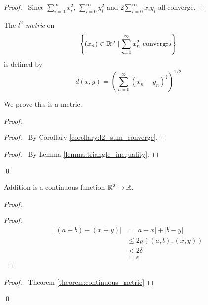 \begin{proof}
    \pf\ Since $\sum_{i=0}^\infty x_i^ 2$, $\sum_{i=0}^\infty y_i^2$ and $2 \sum_{i=0}^\infty x_i y_i$ all converge.
\end{proof}

\begin{definition}[$l^2$-metric]
    The \emph{$l^2$-metric} on 
    \[ \left\{ (x_n) \in \mathbb{R}^\omega \mid \sum_{n=0}^\infty x_n^2 \text{ converges} \right\} \] is defined by
    \[ d(x,y) = \left( \sum_{n=0}^\infty (x_n - y_n)^2 \right)^{1/2} \]
\end{definition}

We prove this is a metric.

\begin{proof}
    \pf
    \begin{proof}
        \pf\ By Corollary \ref{corollary:l2_sum_converge}.
    \end{proof}
    \begin{proof}
        \pf\ By Lemma \ref{lemma:triangle_inequality}.
    \end{proof}
    \qed
\end{proof}

\begin{theorem}
    Addition is a continuous function $\mathbb{R}^2 \rightarrow \mathbb{R}$.
\end{theorem}

\begin{proof}
    \pf
    \begin{proof}
        \pf
        \begin{align*}
            |(a+b)-(x+y)| & = |a-x| + |b-y| \\
            & \leq 2 \rho((a,b),(x,y)) \\
            & < 2 \delta \\
            & = \epsilon
        \end{align*}
    \end{proof}
    \qedstep
    \begin{proof}
        \pf\ Theorem \ref{theorem:continuous_metric}
    \end{proof}
    \qed
\end{proof}

